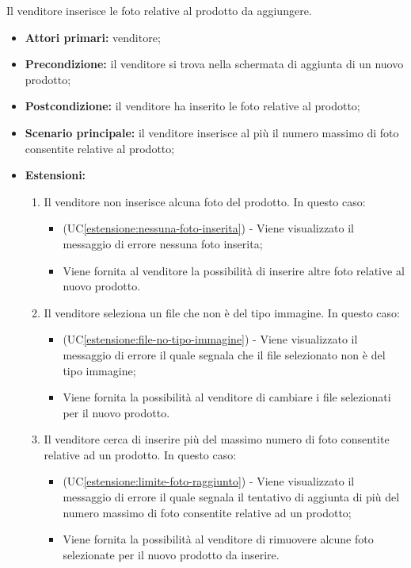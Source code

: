 Il venditore inserisce le foto relative al prodotto da aggiungere.
\begin{itemize}
    \item \textbf{Attori primari:} venditore;
    \item \textbf{Precondizione:} il venditore si trova nella schermata di aggiunta di un nuovo prodotto;
    \item \textbf{Postcondizione:} il venditore ha inserito le foto relative al prodotto;
    \item \textbf{Scenario principale:} il venditore inserisce al più il numero massimo di foto consentite relative al prodotto;
    \item \textbf{Estensioni:}
    \begin{enumerate}[label=\lett]
    	\item Il venditore non inserisce alcuna foto del prodotto. In questo caso:
    	\begin{itemize}
    		\item (UC\ref{estensione:nessuna-foto-inserita}) - Viene visualizzato il messaggio di errore nessuna foto inserita;
    		\item Viene fornita al venditore la possibilità di inserire altre foto relative al nuovo prodotto.
    	\end{itemize}
    	\item Il venditore seleziona un file che non è del tipo immagine. In questo caso:
    	\begin{itemize}
    		\item (UC\ref{estensione:file-no-tipo-immagine}) - Viene visualizzato il messaggio di errore il quale segnala che il file selezionato non è del tipo immagine;
    		\item Viene fornita la possibilità al venditore di cambiare i file selezionati per il nuovo prodotto.
    	\end{itemize}
    	\item Il venditore cerca di inserire più del massimo numero di foto consentite relative ad un prodotto. In questo caso:
    	\begin{itemize}
    		\item (UC\ref{estensione:limite-foto-raggiunto}) - Viene visualizzato il messaggio di errore il quale segnala il tentativo di aggiunta di più del numero massimo di foto consentite relative ad un prodotto;
    		\item Viene fornita la possibilità al venditore di rimuovere alcune foto selezionate per il nuovo prodotto da inserire.
    	\end{itemize}
    \end{enumerate}
\end{itemize}

